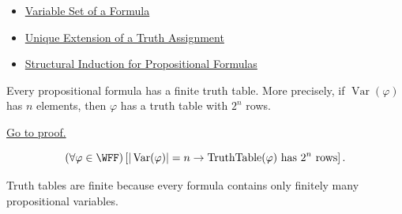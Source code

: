\begin{dependencies}
\begin{itemize}
  \item \hyperref[def:formula-variable-set-propositional-logic]{Variable Set of a Formula}
  \item \hyperref[thm:unique-extension-truth-assignment-propositional-logic]{Unique Extension of a Truth Assignment}
  \item \hyperref[thm:structural-induction-propositional-formulas]{Structural Induction for Propositional Formulas}
\end{itemize}
\end{dependencies}
\begin{tcolorbox}[colback=thmbox, colframe=thmborder, arc=2pt,
  left=6pt, right=6pt, top=4pt, bottom=4pt,
  title={\small\textbf{Theorem (Finite Truth-Table Theorem)}},
  fonttitle=\small\bfseries]
\begin{theorem}
\label{thm:finite-truth-table-propositional-logic}
Every propositional formula has a finite truth table. More precisely, if \(\operatorname{Var}(\varphi)\) has \(n\) elements, then \(\varphi\) has a truth table with \(2^n\) rows.

\noindent\hyperref[prf:finite-truth-table-propositional-logic]{Go to proof.}
\end{theorem}
\end{tcolorbox}

\begin{remark*}
\[
(\forall\varphi\in\WFF)
\left[
|\operatorname{Var}(\varphi)|=n
\to
\operatorname{TruthTable}(\varphi)\text{ has }2^n\text{ rows}
\right].
\]
\end{remark*}

\begin{remark*}[Interpretation]
Truth tables are finite because every formula contains only finitely many propositional variables.
\end{remark*}

